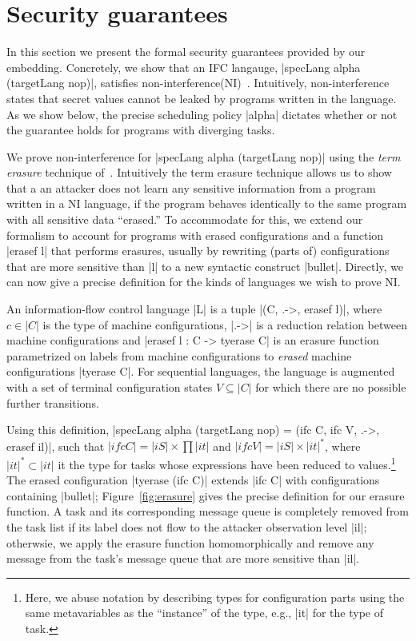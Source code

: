 \section{Security guarantees}
\label{sec:formal}

In this section we present the formal security guarantees provided by
our embedding.
%
Concretely, we show that an IFC langauge, |specLang alpha (targetLang
nop)|, satisfies non-interference(NI)~\tocite{}.
%
Intuitively, non-interference states that secret values cannot be
leaked by programs written in the language.
%
As we show below, the precise scheduling policy |alpha| dictates
whether or not the guarantee holds for programs with diverging tasks.

We prove non-interference for |specLang alpha (targetLang nop)| using
the \emph{term erasure} technique of~\tocite{}.
%
Intuitively the term erasure technique allows us to show that a an
attacker does not learn any sensitive information from a program
written in a NI language, if the program behaves identically to the
same program with all sensitive data ``erased.''
% 
To accommodate for this, we extend our formalism to account for
programs with erased configurations and a function |erasef l| that
performs erasures, usually by rewriting (parts of) configurations that
are more sensitive than |l| to a new syntactic construct |bullet|.
%
Directly, we can now give a precise definition for the kinds of
languages we wish to prove NI.

\begin{definition}
    An information-flow control language |L| is a tuple |(C, .->,
    erasef l)|, where $c \in |C|$ is the type of machine configurations, |.->| is a
    reduction relation between machine configurations and |erasef l : C -> tyerase C|
    is an erasure function parametrized on labels from machine configurations to \emph{erased} machine
    configurations |tyerase C|.  For sequential languages, the
    language is augmented with a set of terminal configuration states $V
    \subseteq |C|$ for which there are no possible further transitions.
\end{definition}

Using this definition, |specLang alpha (targetLang nop) = (ifc C, ifc
V, .->, erasef il)|, such that $|ifc C| = |iS| \times \prod |it|$ and
$|ifc V| = |iS| \times |it|^*$, where $|it|^* \subset |it|$ it the
type for tasks whose expressions have been reduced to
values.\footnote{
  Here, we abuse notation by describing types for configuration parts using the
  same metavariables as the ``instance'' of the type, e.g., |it| for the type of
  task.
}
%
The erased configuration |tyerase (ifc C)| extends |ifc C| with configurations
containing |bullet|; Figure~\ref{fig:erasure} gives the precise definition for
our erasure function.
%
A task and its corresponding message queue is completely removed from the task
list if its label does not flow to the attacker observation level |il|;
otherwsie, we apply the erasure function homomorphically and remove any message
from the task's message queue that are more sensitive than |il|.

